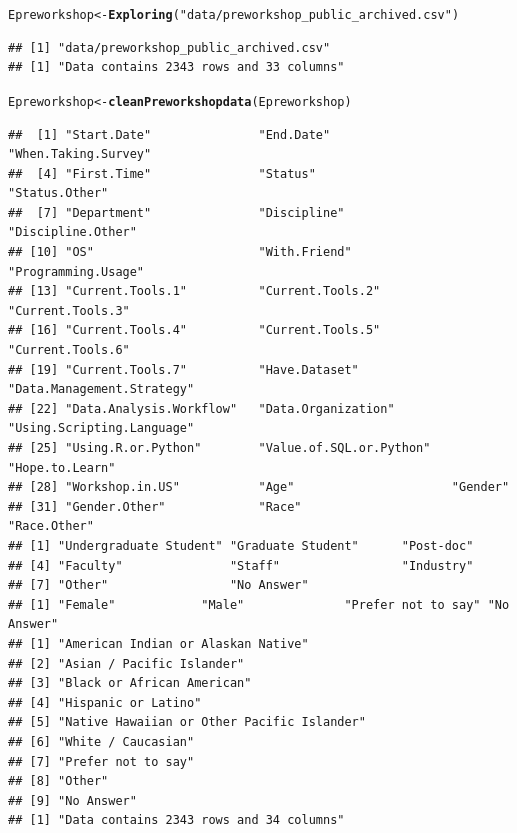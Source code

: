 \documentclass{article}\usepackage[]{graphicx}\usepackage[]{color}
\makeatletter
\newcommand{\hlstr}[1]{\textcolor[rgb]{0.192,0.494,0.8}{#1}}%
\newcommand{\hlstd}[1]{\textcolor[rgb]{0.345,0.345,0.345}{#1}}%
\newcommand{\hlkwb}[1]{\textcolor[rgb]{0.69,0.353,0.396}{#1}}%
\newcommand{\hlkwd}[1]{\textcolor[rgb]{0.737,0.353,0.396}{\textbf{#1}}}%
\newenvironment{kframe}{%
 \def\at@end@of@kframe{}%
 \ifinner\ifhmode%
  \def\at@end@of@kframe{\end{minipage}}%
  \begin{minipage}{\columnwidth}%
 \fi\fi%
 \def\FrameCommand##1{\hskip\@totalleftmargin \hskip-\fboxsep
 \colorbox{shadecolor}{##1}\hskip-\fboxsep
     \hskip-\linewidth \hskip-\@totalleftmargin \hskip\columnwidth}%
 \MakeFramed {\advance\hsize-\width
   \@totalleftmargin\z@ \linewidth\hsize
   \@setminipage}}%
 {\par\unskip\endMakeFramed%
 \at@end@of@kframe}
\newenvironment{knitrout}{}{} %
\makeatother
\begin{document}
\begin{knitrout}
\color{fgcolor}\begin{kframe}
\begin{alltt}
\hlstd{Epreworkshop} \hlkwb{<-} \hlkwd{Exploring}\hlstd{(}\hlstr{"data/preworkshop_public_archived.csv"}\hlstd{)}
\end{alltt}
\begin{verbatim}
## [1] "data/preworkshop_public_archived.csv"
## [1] "Data contains 2343 rows and 33 columns"
\end{verbatim}
\begin{alltt}
\hlstd{Epreworkshop} \hlkwb{<-} \hlkwd{cleanPreworkshopdata}\hlstd{(Epreworkshop)}
\end{alltt}
\begin{verbatim}
##  [1] "Start.Date"               "End.Date"                 "When.Taking.Survey"      
##  [4] "First.Time"               "Status"                   "Status.Other"            
##  [7] "Department"               "Discipline"               "Discipline.Other"        
## [10] "OS"                       "With.Friend"              "Programming.Usage"       
## [13] "Current.Tools.1"          "Current.Tools.2"          "Current.Tools.3"         
## [16] "Current.Tools.4"          "Current.Tools.5"          "Current.Tools.6"         
## [19] "Current.Tools.7"          "Have.Dataset"             "Data.Management.Strategy"
## [22] "Data.Analysis.Workflow"   "Data.Organization"        "Using.Scripting.Language"
## [25] "Using.R.or.Python"        "Value.of.SQL.or.Python"   "Hope.to.Learn"           
## [28] "Workshop.in.US"           "Age"                      "Gender"                  
## [31] "Gender.Other"             "Race"                     "Race.Other"              
## [1] "Undergraduate Student" "Graduate Student"      "Post-doc"             
## [4] "Faculty"               "Staff"                 "Industry"             
## [7] "Other"                 "No Answer"            
## [1] "Female"            "Male"              "Prefer not to say" "No Answer"        
## [1] "American Indian or Alaskan Native"        
## [2] "Asian / Pacific Islander"                 
## [3] "Black or African American"                
## [4] "Hispanic or Latino"                       
## [5] "Native Hawaiian or Other Pacific Islander"
## [6] "White / Caucasian"                        
## [7] "Prefer not to say"                        
## [8] "Other"                                    
## [9] "No Answer"                                
## [1] "Data contains 2343 rows and 34 columns"
\end{verbatim}
\end{kframe}
\end{knitrout}
\end{document}
